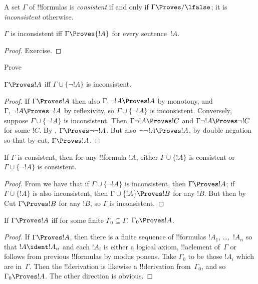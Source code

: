\documentclass[../../../include/open-logic-section]{subfiles}
\begin{document}
\begin{defn}[Consistency]
A set $\Gamma$ of !!{formula}s is \emph{consistent} if and only if
$\Gamma\Proves/ \lfalse$; it is \emph{inconsistent} otherwise.
\end{defn}

\begin{prop}
$\Gamma$ is inconsistent iff $\Gamma \Proves {!A}$ for every
  sentence~$!A$.
\end{prop}

\begin{proof}
Exercise.
\end{proof}

\begin{prob}
Prove 
\end{prob}

\begin{prop} 
$\Gamma \Proves !A$ iff $\Gamma \cup \{\lnot !A\}$ is inconsistent.
\end{prop}

\begin{proof}
If $\Gamma \Proves !A$ then also $\Gamma, \lnot !A \Proves !A$ by
monotony, and $\Gamma, \lnot !A \Proves \lnot !A$ by reflexivity, so
$\Gamma \cup \{\lnot !A\}$ is inconsistent.  Conversely, suppose
$\Gamma \cup \{\lnot !A\}$ is inconsistent. Then $\Gamma \lnot !A
\Proves !C$ and $\Gamma \lnot !A \Proves \lnot !C$ for some $!C$. By
, $\Gamma
\Proves \lnot \lnot !A$. But also $\lnot\lnot!A \Proves !A$, by double
negation so that by cut, $\Gamma \Proves !A$.
\end{proof}

\begin{prop}
If $\Gamma$ is consistent, then for any !!{formula} $!A$, either
$\Gamma \cup\{!A\}$ is consistent or $\Gamma \cup\{\lnot !A\}$ is
consistent.
\end{prop}

\begin{proof}
From  we have that if $\Gamma \cup \{\lnot !A\}$ is
inconsistent, then $\Gamma \Proves !A$; if $\Gamma \cup \{ !A\}$ is
also inconsistent, then $\Gamma \cup \{!A\} \Proves !B$ for any
$!B$. But then by Cut $\Gamma \Proves !B$ for any $!B$, so $\Gamma$ is
inconsistent.
\end{proof}

\begin{prop}
If $\Gamma \Proves !A$ iff for some finite $\Gamma_0 \subseteq
\Gamma$, $\Gamma_0 \Proves !A$.
\end{prop}

\begin{proof}
If $\Gamma \Proves !A$, then there is a finite sequence of
!!{formula}s $!A_1$, \dots,~$!A_n$ so that $!A \ident !A_n$ and each
$!A_i$ is either a logical axiom, !!a{element} of~$\Gamma$ or follows
from previous !!{formula}s by modus ponens.  Take $\Gamma_0$ to be
those $!A_i$ which are in~$\Gamma$.  Then the !!{derivation} is
likewise a !!{derivation} from~$\Gamma_0$, and so $\Gamma_0 \Proves
!A$.  The other direction is obvious.
\end{proof}
\end{document}
